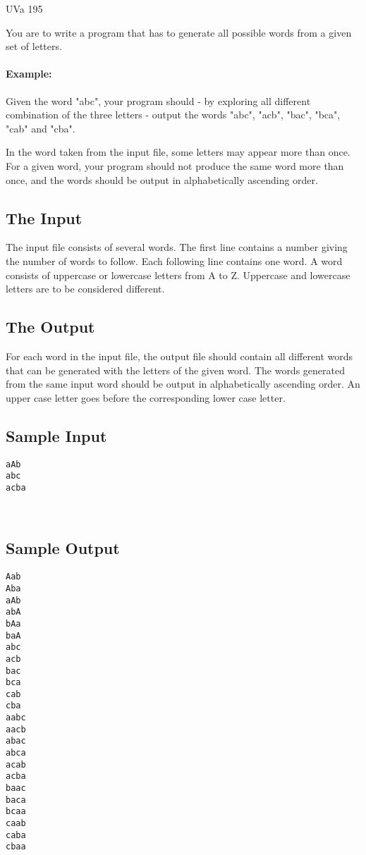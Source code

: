 
\noindent
UVa 195\bigskip

You are to write a program that has to generate all possible words from
a given set of letters.

\paragraph{Example:}
Given the word "abc", your program should - by exploring all different
combination of the three letters - output the words "abc", "acb",
"bac", "bca", "cab" and "cba".

In the word taken from the input file, some letters may appear more than
once. For a given word, your program should not produce the same word more
than once, and the words should be output in alphabetically ascending order.



\subsection*{The Input}

The input file consists of several words. The first line contains a number
giving the number of words to follow. Each following line contains one word.
A word consists of uppercase or lowercase letters from A to Z. Uppercase
and lowercase letters are to be considered different.

\subsection*{The Output}

For each word in the input file, the output file should contain all different
words that can be generated with the letters of the given word. The words
generated from the same input word should be output in alphabetically ascending
order. An upper case letter goes before the corresponding lower case letter.

\begin{multicols*}{2}
\subsection*{Sample Input}
\begin{verbatim}
aAb
abc
acba
\end{verbatim}
\vfill~\columnbreak

\subsection*{Sample Output}
\begin{verbatim}
Aab
Aba
aAb
abA
bAa
baA
abc
acb
bac
bca
cab
cba
aabc
aacb
abac
abca
acab
acba
baac
baca
bcaa
caab
caba
cbaa
\end{verbatim}
\end{multicols*}